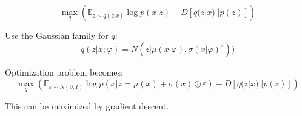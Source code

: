 \documentclass[xcolor={dvipsnames}]{beamer}
\renewcommand{\phi}{\varphi}
\renewcommand{\epsilon}{\varepsilon}
\newcommand{\EE}{\mathbb{E}}
\begin{document}
\begin{frame}
    \setlength\parskip{1em}

    \[
        \max_q\left(\EE_{z\sim q(z|x)}\log p(x|z) - D[q(z|x)||p(z)]\right)%
    \]

    Use the Gaussian family for $q$:
    \[
    q(z|x;\phi) = N(z|\mu(x|\phi), \sigma(x|\phi)^2)) 
    \]

    Optimization problem becomes:
    \[
    \max_q\left(\EE_{\epsilon\sim N(0,I)}\log p(x|z=\mu(x) + \sigma(x)\odot\epsilon) - D[q(z|x)||p(z)]\right)%
    \]

    This can be maximized by gradient descent.

    

\end{frame}
\end{document}
